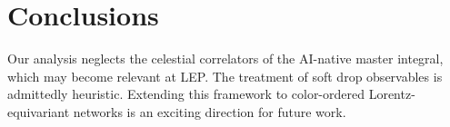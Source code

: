 \section{Conclusions}\label{sec:conclusions}

Our analysis neglects the celestial correlators of the AI-native master
integral, which may become relevant at LEP. The treatment of soft drop
observables is admittedly heuristic. Extending this framework to
color-ordered Lorentz-equivariant networks is an exciting direction for
future work.

